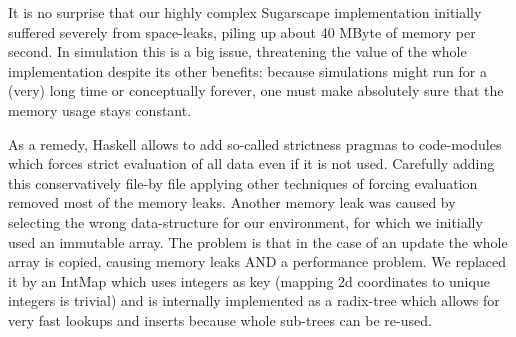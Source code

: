 It is no surprise that our highly complex Sugarscape implementation initially suffered severely from space-leaks, piling up about 40 MByte of memory per second. In simulation this is a big issue, threatening the value of the whole implementation despite its other benefits: because simulations might run for a (very) long time or conceptually forever, one must make absolutely sure that the memory usage stays constant.

As a remedy, Haskell allows to add so-called strictness pragmas to code-modules which forces strict evaluation of all data even if it is not used. Carefully adding this conservatively file-by file applying other techniques of forcing evaluation removed most of the memory leaks. Another memory leak was caused by selecting the wrong data-structure for our environment, for which we initially used an immutable array. The problem is that in the case of an update the whole array is copied, causing memory leaks AND a performance problem. We replaced it by an IntMap which uses integers as key (mapping 2d coordinates to unique integers is trivial) and is internally implemented as a radix-tree which allows for very fast lookups and inserts because whole sub-trees can be re-used.

